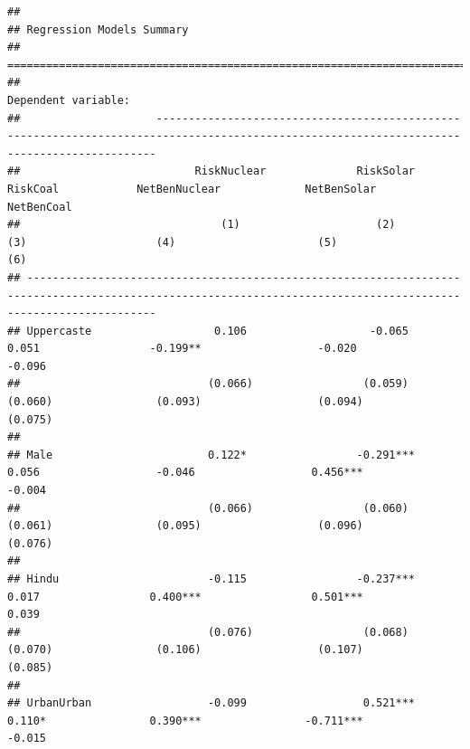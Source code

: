 \documentclass[
]{article}
\begin{document}
\begin{verbatim}
## 
## Regression Models Summary
## ================================================================================================================================================================
##                                                                                 Dependent variable:                                                             
##                     --------------------------------------------------------------------------------------------------------------------------------------------
##                           RiskNuclear              RiskSolar               RiskCoal            NetBenNuclear             NetBenSolar             NetBenCoal     
##                               (1)                     (2)                    (3)                    (4)                      (5)                    (6)         
## ----------------------------------------------------------------------------------------------------------------------------------------------------------------
## Uppercaste                   0.106                   -0.065                 0.051                 -0.199**                  -0.020                 -0.096       
##                             (0.066)                 (0.059)                (0.060)                (0.093)                  (0.094)                (0.075)       
##                                                                                                                                                                 
## Male                        0.122*                 -0.291***                0.056                  -0.046                  0.456***                -0.004       
##                             (0.066)                 (0.060)                (0.061)                (0.095)                  (0.096)                (0.076)       
##                                                                                                                                                                 
## Hindu                       -0.115                 -0.237***                0.017                 0.400***                 0.501***                0.039        
##                             (0.076)                 (0.068)                (0.070)                (0.106)                  (0.107)                (0.085)       
##                                                                                                                                                                 
## UrbanUrban                  -0.099                  0.521***                0.110*                0.390***                -0.711***                -0.015       

\end{verbatim}
\end{document}
